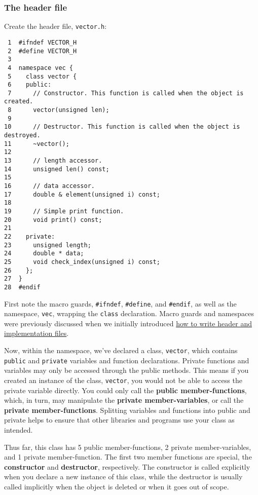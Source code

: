 \documentclass[11pt]{article}
\begin{document}
\subsubsection{The header file}
\label{sec:orgheadline49}
Create the header file, \texttt{vector.h}:

\begin{verbatim}
 1  #ifndef VECTOR_H
 2  #define VECTOR_H
 3  
 4  namespace vec {
 5    class vector {
 6    public:
 7      // Constructor. This function is called when the object is created.
 8      vector(unsigned len);
 9  
10      // Destructor. This function is called when the object is destroyed.
11      ~vector();
12  
13      // length accessor.
14      unsigned len() const;
15  
16      // data accessor.
17      double & element(unsigned i) const;
18  
19      // Simple print function.
20      void print() const;
21  
22    private:
23      unsigned length;
24      double * data;
25      void check_index(unsigned i) const;
26    };
27  }
28  #endif
\end{verbatim}

First note the macro guards, \texttt{\#ifndef}, \texttt{\#define}, and \texttt{\#endif}, as well as the 
namespace, \texttt{vec}, wrapping the \texttt{class} declaration. Macro guards and namespaces 
were previously discussed when we initially introduced 
\hyperref[sec:orgheadline45]{how to write header and implementation files}. 

Now, within the namespace, we've declared a class, \texttt{vector}, which 
contains \texttt{public} and \texttt{private} variables and function declarations. Private 
functions and variables may only be accessed through the public methods. This 
means if you created an instance of the class, \texttt{vector}, you would not be able 
to access the private variable directly. You could only call the \textbf{public 
member-functions}, which, in turn, may manipulate the 
\textbf{private member-variables}, or call the \textbf{private member-functions}. 
Splitting variables and functions into public and private helps to ensure 
that other libraries and programs use your class as intended.

Thus far, this class has 5 public member-functions, 2 private member-variables, 
and 1 private member-function. The first two member functions are special, 
the \textbf{constructor} and \textbf{destructor}, respectively. The constructor is called 
explicitly when you declare a new instance of this class, while the destructor 
is usually called implicitly when the object is deleted or when it goes out of 
scope.
\end{document}
